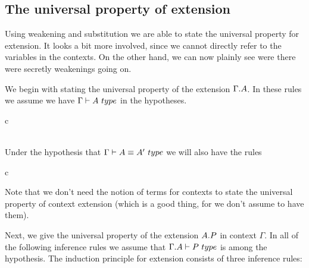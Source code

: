 \subsection{The universal property of extension}

Using weakening and substitution we are able to state the universal property
for extension. It looks a bit more involved, since we cannot directly refer
to the variables in the contexts. On the other hand, we can now plainly see
were there were secretly weakenings going on.

We begin with stating the universal property of the extension $\ctxext{\Gamma}{A}$.
In these rules we assume we have $\jtype{\Gamma}{A}$ in the hypotheses.

\begin{infarray}{c}
\inference{}
{}\\
  {}\\
  {}
\end{infarray}

Under the hypothesis that $\jtypeeq{\Gamma}{A}{A'}$
we will also have the rules

\begin{infarray}{c}
\\
{}
\end{infarray}

Note that we don't need the notion of terms for contexts to state the universal
property of context extension (which is a good thing, for we don't assume to have them).

Next, we give the universal property of the extension $\ctxext{A}{P}$ in context
$\Gamma$.
In all of the following inference rules we assume that $\jtype{\ctxext{\Gamma}{A}}{P}$
is among the hypothesis. The induction principle for extension consists of three
inference rules:

